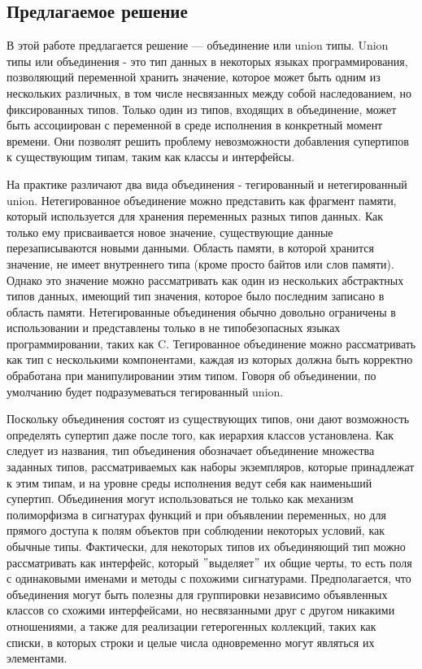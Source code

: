 \subsection{Предлагаемое решение}

В этой работе предлагается решение — объединение или union типы.
Union типы или объединения - это тип данных в некоторых языках программирования, позволяющий
переменной хранить значение, которое может быть одним из нескольких различных, в том числе
несвязанных между собой наследованием, но фиксированных типов.
Только один из типов, входящих в объединение, может быть ассоциирован с переменной в среде исполнения в
конкретный момент времени.
Они позволят решить проблему невозможности добавления супертипов к существующим типам, таким как классы и интерфейсы.

На практике различают два вида объединения - тегированный и нетегированный union.
Нетегированное объединение можно представить как фрагмент памяти, который используется для хранения переменных разных
типов данных.
Как только ему присваивается новое значение, существующие данные перезаписываются новыми данными.
Область памяти, в которой хранится значение, не имеет внутреннего типа (кроме просто байтов или слов памяти).
Однако это значение можно рассматривать как один из нескольких абстрактных типов данных, имеющий тип значения,
которое было последним записано в область памяти.
Нетегированные объединения обычно довольно ограничены в использовании и представлены только в не типобезопасных языках
программировании, таких как C\@.
Тегированное объединение можно рассматривать как тип с несколькими компонентами, каждая из которых должна быть
корректно обработана при манипулировании этим типом.
Говоря об объединении, по умолчанию будет подразумеваться тегированный union.

Поскольку объединения состоят из существующих типов, они дают возможность определять супертип даже после того,
как иерархия классов установлена.
Как следует из названия, тип объединения обозначает объединение множества заданных типов, рассматриваемых как наборы
экземпляров, которые принадлежат к этим типам, и на уровне среды исполнения ведут себя как наименьший супертип.
Объединения могут использоваться не только как механизм полиморфизма в сигнатурах функций и при объявлении переменных,
но для прямого доступа к полям объектов при соблюдении некоторых условий, как обычные типы.
Фактически, для некоторых типов их объединяющий тип можно рассматривать как интерфейс,
который \("\)выделяет\("\) их общие черты, то есть поля с одинаковыми именами и методы с похожими сигнатурами.
Предполагается, что объединения могут быть полезны для группировки независимо объявленных классов со схожими
интерфейсами, но несвязанными друг с другом никакими отношениями, а также для реализации гетерогенных коллекций,
таких как списки, в которых строки и целые числа одновременно могут являться их элементами.

